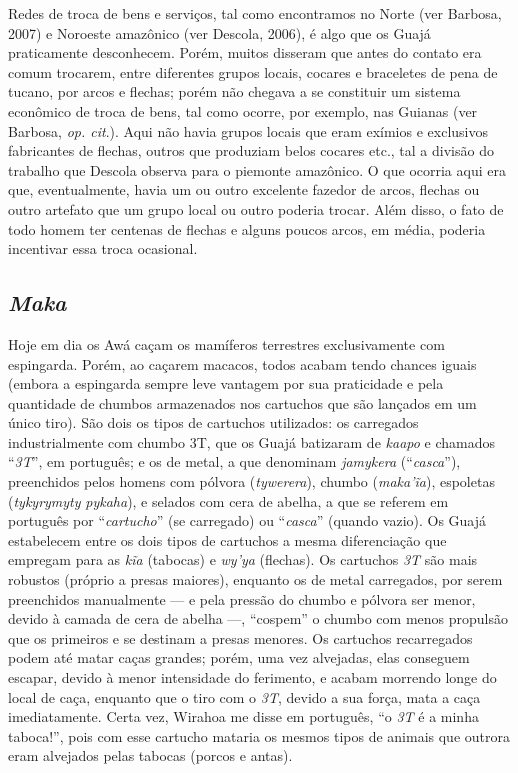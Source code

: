 Redes de troca de bens e serviços, tal como encontramos no Norte (ver
Barbosa, 2007) e Noroeste amazônico (ver Descola, 2006), é algo que os
Guajá praticamente desconhecem. Porém, muitos disseram que antes do
contato era comum trocarem, entre diferentes grupos locais, cocares e
braceletes de pena de tucano, por arcos e flechas; porém não chegava a
se constituir um sistema econômico de troca de bens, tal como ocorre,
por exemplo, nas Guianas (ver Barbosa, \emph{op. cit}.). Aqui não havia grupos
locais que eram exímios e exclusivos fabricantes de flechas, outros que
produziam belos cocares etc., tal a divisão do trabalho que Descola
observa para o piemonte amazônico. O que ocorria aqui era que,
eventualmente, havia um ou outro excelente fazedor de arcos, flechas ou
outro artefato que um grupo local ou outro poderia trocar. Além disso, o
fato de todo homem ter centenas de flechas e alguns poucos arcos, em
média, poderia incentivar essa troca ocasional.

\subsection{\emph{Maka}}

\forceindent
Hoje em dia os Awá caçam os mamíferos terrestres exclusivamente com
espingarda. Porém, ao caçarem macacos, todos acabam tendo chances iguais
(embora a espingarda sempre leve vantagem por sua praticidade e pela
quantidade de chumbos armazenados nos cartuchos que são lançados em um
único tiro). São dois os tipos de cartuchos utilizados: os carregados
industrialmente com chumbo 3T, que os Guajá batizaram de \emph{kaapo} e
chamados ``\emph{3T}'', em português; e os de metal, a que denominam
\emph{jamykera} (``\emph{casca}''), preenchidos pelos homens com pólvora
(\emph{tywerera}), chumbo (\emph{maka'ĩa}), espoletas (\emph{tykyrymyty}
\emph{pykaha}), e selados com cera de abelha, a que se referem em
português por ``\emph{cartucho}'' (se carregado) ou ``\emph{casca}'' (quando
vazio). Os Guajá estabelecem entre os dois tipos de cartuchos a mesma
diferenciação que empregam para as \emph{kĩa} (tabocas) e \emph{wy'ya}
(flechas). Os cartuchos \emph{3T} são mais robustos (próprio a presas
maiores), enquanto os de metal carregados, por serem preenchidos
manualmente --- e pela pressão do chumbo e pólvora ser menor, devido à
camada de cera de abelha ---, ``cospem'' o chumbo com menos propulsão que
os primeiros e se destinam a presas menores. Os cartuchos recarregados
podem até matar caças grandes; porém, uma vez alvejadas, elas conseguem
escapar, devido à menor intensidade do ferimento, e acabam morrendo
longe do local de caça, enquanto que o tiro com o \emph{3T}, devido a
sua força, mata a caça imediatamente. Certa vez, Wirahoa me disse em
português, ``o \emph{3T} é a minha taboca!'', pois com esse cartucho
mataria os mesmos tipos de animais que outrora eram alvejados pelas
tabocas (porcos e antas).

